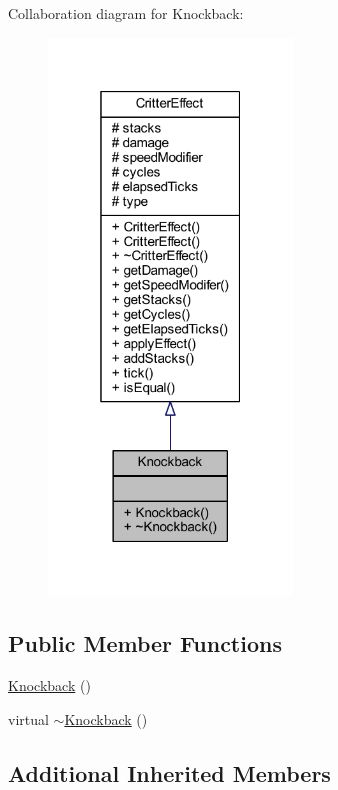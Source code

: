 Collaboration diagram for Knockback\+:
\nopagebreak
\begin{figure}[H]
\begin{center}
\leavevmode
\includegraphics[width=184pt]{struct_knockback__coll__graph}
\end{center}
\end{figure}
\subsection*{Public Member Functions}
\begin{DoxyCompactItemize}
\item 
\hyperlink{struct_knockback_a67a91ac59578034add46e9c4dbcbad66}{Knockback} ()
\item 
virtual \hyperlink{struct_knockback_af64369e1d88b1008a3217ab372564973}{$\sim$\+Knockback} ()
\end{DoxyCompactItemize}
\subsection*{Additional Inherited Members}


